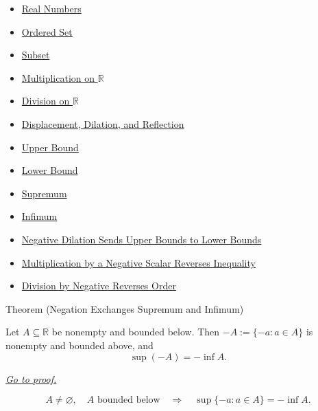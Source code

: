 \begin{dependencies}
\begin{itemize}
  \item \hyperref[def:reals]{Real Numbers}
  \item \hyperref[def:ordered-set]{Ordered Set}
  \item \hyperref[def:subset]{Subset}
  \item \hyperref[def:multiplication-on-r]{Multiplication on $\mathbb{R}$}
  \item \hyperref[def:division-on-r]{Division on $\mathbb{R}$}
  \item \hyperref[def:displacement-dilation-reflection]{Displacement, Dilation, and Reflection}
  \item \hyperref[def:real-upper-bound]{Upper Bound}
  \item \hyperref[def:real-lower-bound]{Lower Bound}
  \item \hyperref[def:supremum]{Supremum}
  \item \hyperref[def:infimum]{Infimum}
  \item \hyperref[prop:negative-dilation-sends-upper-to-lower-bounds]{Negative Dilation Sends Upper Bounds to Lower Bounds}
  \item \hyperref[thm:ineq-multiply-negative]{Multiplication by a Negative Scalar Reverses Inequality}
  \item \hyperref[lem:division-by-negative-reverses-order]{Division by Negative Reverses Order}
\end{itemize}
\end{dependencies}


\begin{theorembox}{Theorem (Negation Exchanges Supremum and Infimum)}
\begin{theorem}
\label{thm:negation-exchange-sup-inf}
Let $A\subseteq\mathbb{R}$ be nonempty and bounded below.  Then
$-A:=\{-a:a\in A\}$ is nonempty and bounded above, and
\[
  \sup(-A)=-\inf A.
\]

\smallskip
\noindent
\hyperref[prf:negation-exchange-sup-inf]{\textit{Go to proof.}}
\end{theorem}
\end{theorembox}

\begin{remark*}
\[
A\neq\varnothing,\quad A\text{ bounded below}
\quad\Longrightarrow\quad
\sup\{-a:a\in A\}=-\inf A.
\]
\end{remark*}

